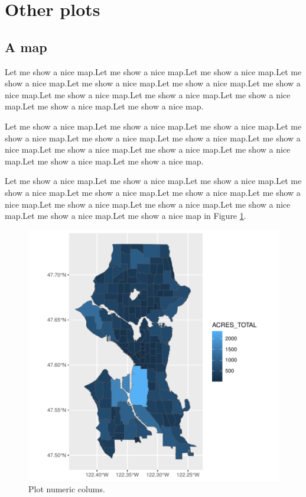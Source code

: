 \documentclass[a4paper, 12pt]{article}
\begin{document}
\section{Other plots}\label{otherPlots}


\subsection{A map}\label{mapPlot}

Let me show a nice map.Let me show a nice map.Let me show a nice map.Let me show a nice map.Let me show a nice map.Let me show a nice map.Let me show a nice map.Let me show a nice map.Let me show a nice map.Let me show a nice map.Let me show a nice map.Let me show a nice map.

Let me show a nice map.Let me show a nice map.Let me show a nice map.Let me show a nice map.Let me show a nice map.Let me show a nice map.Let me show a nice map.Let me show a nice map.Let me show a nice map.Let me show a nice map.Let me show a nice map.Let me show a nice map.

Let me show a nice map.Let me show a nice map.Let me show a nice map.Let me show a nice map.Let me show a nice map.Let me show a nice map.Let me show a nice map.Let me show a nice map.Let me show a nice map.Let me show a nice map.Let me show a nice map.Let me show a nice map in Figure \ref{plot-cityMap}.


\begin{figure}[h]
\centering
\begin{adjustbox}{width=10cm,height=10cm} 
\includegraphics{WorkInR_forPrinter-plot-cityMap}
\end{adjustbox}
\caption{Plot numeric colums.}  
\label{plot-cityMap} 
\end{figure}
\end{document}
